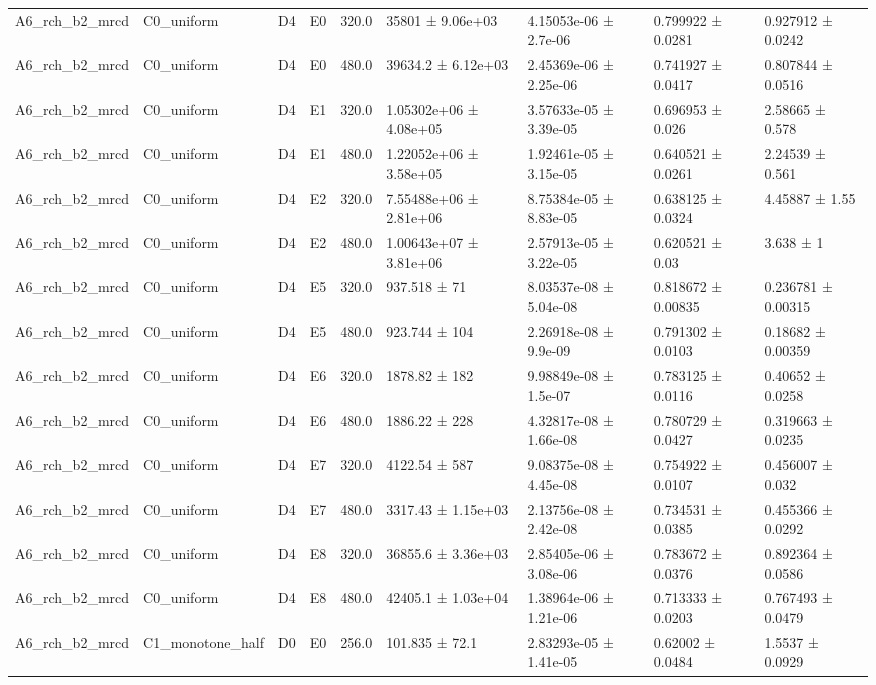 \begin{table}
\begin{tabular}{lllllllll}
A6\_rch\_b2\_mrcd & C0\_uniform & D4 & E0 & 320.0 & 35801 ± 9.06e+03 & 4.15053e-06 ± 2.7e-06 & 0.799922 ± 0.0281 & 0.927912 ± 0.0242 \\
A6\_rch\_b2\_mrcd & C0\_uniform & D4 & E0 & 480.0 & 39634.2 ± 6.12e+03 & 2.45369e-06 ± 2.25e-06 & 0.741927 ± 0.0417 & 0.807844 ± 0.0516 \\
A6\_rch\_b2\_mrcd & C0\_uniform & D4 & E1 & 320.0 & 1.05302e+06 ± 4.08e+05 & 3.57633e-05 ± 3.39e-05 & 0.696953 ± 0.026 & 2.58665 ± 0.578 \\
A6\_rch\_b2\_mrcd & C0\_uniform & D4 & E1 & 480.0 & 1.22052e+06 ± 3.58e+05 & 1.92461e-05 ± 3.15e-05 & 0.640521 ± 0.0261 & 2.24539 ± 0.561 \\
A6\_rch\_b2\_mrcd & C0\_uniform & D4 & E2 & 320.0 & 7.55488e+06 ± 2.81e+06 & 8.75384e-05 ± 8.83e-05 & 0.638125 ± 0.0324 & 4.45887 ± 1.55 \\
A6\_rch\_b2\_mrcd & C0\_uniform & D4 & E2 & 480.0 & 1.00643e+07 ± 3.81e+06 & 2.57913e-05 ± 3.22e-05 & 0.620521 ± 0.03 & 3.638 ± 1 \\
A6\_rch\_b2\_mrcd & C0\_uniform & D4 & E5 & 320.0 & 937.518 ± 71 & 8.03537e-08 ± 5.04e-08 & 0.818672 ± 0.00835 & 0.236781 ± 0.00315 \\
A6\_rch\_b2\_mrcd & C0\_uniform & D4 & E5 & 480.0 & 923.744 ± 104 & 2.26918e-08 ± 9.9e-09 & 0.791302 ± 0.0103 & 0.18682 ± 0.00359 \\
A6\_rch\_b2\_mrcd & C0\_uniform & D4 & E6 & 320.0 & 1878.82 ± 182 & 9.98849e-08 ± 1.5e-07 & 0.783125 ± 0.0116 & 0.40652 ± 0.0258 \\
A6\_rch\_b2\_mrcd & C0\_uniform & D4 & E6 & 480.0 & 1886.22 ± 228 & 4.32817e-08 ± 1.66e-08 & 0.780729 ± 0.0427 & 0.319663 ± 0.0235 \\
A6\_rch\_b2\_mrcd & C0\_uniform & D4 & E7 & 320.0 & 4122.54 ± 587 & 9.08375e-08 ± 4.45e-08 & 0.754922 ± 0.0107 & 0.456007 ± 0.032 \\
A6\_rch\_b2\_mrcd & C0\_uniform & D4 & E7 & 480.0 & 3317.43 ± 1.15e+03 & 2.13756e-08 ± 2.42e-08 & 0.734531 ± 0.0385 & 0.455366 ± 0.0292 \\
A6\_rch\_b2\_mrcd & C0\_uniform & D4 & E8 & 320.0 & 36855.6 ± 3.36e+03 & 2.85405e-06 ± 3.08e-06 & 0.783672 ± 0.0376 & 0.892364 ± 0.0586 \\
A6\_rch\_b2\_mrcd & C0\_uniform & D4 & E8 & 480.0 & 42405.1 ± 1.03e+04 & 1.38964e-06 ± 1.21e-06 & 0.713333 ± 0.0203 & 0.767493 ± 0.0479 \\
A6\_rch\_b2\_mrcd & C1\_monotone\_half & D0 & E0 & 256.0 & 101.835 ± 72.1 & 2.83293e-05 ± 1.41e-05 & 0.62002 ± 0.0484 & 1.5537 ± 0.0929 \\

\end{tabular}
\end{table}
